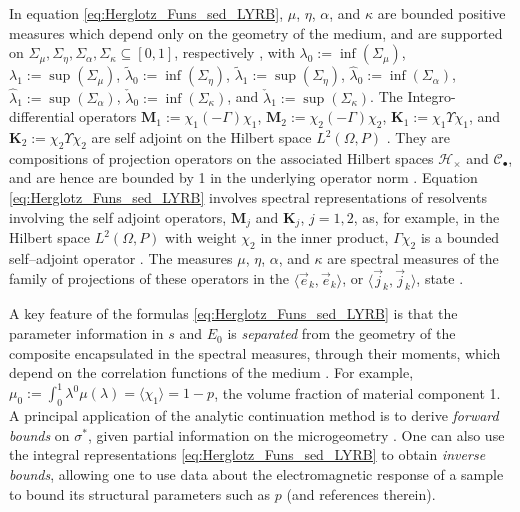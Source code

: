 \documentclass[jmp,graphicx]{revtex4-1}
\begin{document}
In equation
\eqref{eq:Herglotz_Funs_sed_LYRB}, $\mu$, $\eta$, $\alpha$, and $\kappa$
are bounded positive measures which depend only on the geometry of the
medium, and are supported on $\Sigma_\mu,\Sigma_\eta,\Sigma_\alpha,\Sigma_\kappa\subseteq[0,1]$, respectively
\cite{Golden:CMP-473,Bergman:AP-78}, with
%
%
$\lambda_0:=\inf(\Sigma_\mu)$, $\lambda_1:=\sup(\Sigma_\mu)$, $\tilde{\lambda}_0:=\inf(\Sigma_\eta)$,
$\tilde{\lambda}_1:=\sup(\Sigma_\eta)$, $\hat{\lambda}_0:=\inf(\Sigma_\alpha)$,
$\hat{\lambda}_1:=\sup(\Sigma_\alpha)$, $\check{\lambda}_0:=\inf(\Sigma_\kappa)$, and
$\check{\lambda}_1:=\sup(\Sigma_\kappa)$. The Integro-differential operators
$\mathbf{M}_1:=\chi_1(-\Gamma)\chi_1$, $\mathbf{M}_2:=\chi_2(-\Gamma)\chi_2$,
$\mathbf{K}_1:=\chi_1\Upsilon\chi_1$, and $\mathbf{K}_2:=\chi_2\Upsilon\chi_2$ are self adjoint
on the Hilbert space $L^2(\Omega,P)$ \cite{Golden:CMP-473}. They are
compositions of projection operators on the associated Hilbert spaces
$\mathscr{H}_\times$ and $\mathscr{C}_\bullet$, and are hence are bounded by 1 in
the underlying operator norm
\cite{Folland:95,Golden:CMP-473}. Equation
\eqref{eq:Herglotz_Funs_sed_LYRB} involves spectral representations of
resolvents involving the self adjoint operators, $\mathbf{M}_j$ and
$\mathbf{K}_j$, $j=1,2$, as, for example, in the Hilbert space
$L^2(\Omega,P)$ with weight $\chi_2$ in the inner product, $\Gamma\chi_2$ is a
bounded self--adjoint operator \cite{Golden:CMP-473}. The measures
$\mu$, $\eta$, $\alpha$, and $\kappa$ are spectral measures of the family of
projections of these operators in the $\langle\vec{e}_k,\vec{e}_k\rangle$, or 
$\langle\vec{j}_k,\vec{j}_k\rangle$, state \cite{Golden:CMP-473,Reed-1980}.

A key feature of the formulas \eqref{eq:Herglotz_Funs_sed_LYRB} is
that the parameter information in $s$ and $E_0$ is {\it separated}
from the geometry of the composite encapsulated in the spectral
measures, through their moments, which depend on the correlation 
functions of the medium \cite{Golden:CMP-473}. For example, 
$\mu_0:=\int_0^1\lambda^0\mu(\lambda)=\langle\chi_1\rangle=1-p$, the volume fraction of material
component 1. A principal application of the analytic continuation
method is to derive \emph{forward bounds} on $\sigma^*$, given partial
information on the microgeometry
\cite{Bergman:PRL-1285,Milton:APL-300,Golden:CMP-473,Bergman:AP-78}. One  
can also use the integral representations
\eqref{eq:Herglotz_Funs_sed_LYRB} to obtain \emph{inverse bounds},
allowing one to use data about the electromagnetic response of a
sample to bound its structural parameters such as $p$
\cite{Golden:JoB:337} (and references therein).
         
\end{document}
